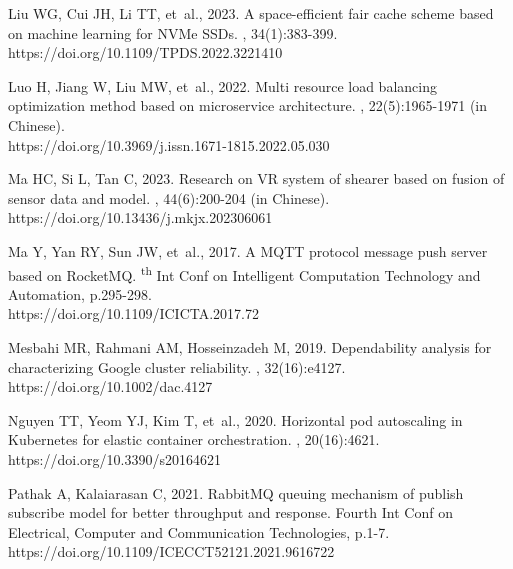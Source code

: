 \documentclass[twoside,twocolumn]{article}
\begin{document}
\begin{thebibliography}{}
Liu WG, Cui JH, Li TT, {et~al.}, 2023.
\newblock A space-efficient fair cache scheme based on machine learning for NVMe SSDs.
, 34(1):383-399. \\
https://doi.org/10.1109/TPDS.2022.3221410


Luo H, Jiang W, Liu MW, {et~al.}, 2022.
\newblock Multi resource load balancing optimization method based on microservice architecture.
, 22(5):1965-1971 (in Chinese). \\
https://doi.org/10.3969/j.issn.1671-1815.2022.05.030


Ma HC, Si L, Tan C, 2023.
\newblock Research on VR system of shearer based on fusion of sensor data and model.
, 44(6):200-204 (in Chinese). \\
https://doi.org/10.13436/j.mkjx.202306061


Ma Y, Yan RY, Sun JW, {et~al.}, 2017.
\newblock A MQTT protocol message push server based on RocketMQ.
\textsuperscript{th} Int Conf on Intelligent Computation Technology and Automation, p.295-298. \\
https://doi.org/10.1109/ICICTA.2017.72


Mesbahi MR, Rahmani AM, Hosseinzadeh M, 2019.
\newblock Dependability analysis for characterizing Google cluster reliability.
, 32(16):e4127. \\
https://doi.org/10.1002/dac.4127


Nguyen TT, Yeom YJ, Kim T, {et~al.}, 2020.
\newblock Horizontal pod autoscaling in Kubernetes for elastic container orchestration.
, 20(16):4621. \\
https://doi.org/10.3390/s20164621


Pathak A, Kalaiarasan C, 2021.
\newblock RabbitMQ queuing mechanism of publish subscribe model for better throughput and response.
\newblock Fourth Int Conf on Electrical, Computer and Communication Technologies, p.1-7. \\
https://doi.org/10.1109/ICECCT52121.2021.9616722



\end{thebibliography}
\end{document}

